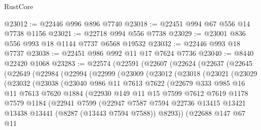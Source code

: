 \begin{lexlean}{RustCore}
\begin{coremodule}
@23012 := @22446 @996 @896 @7740
@23018 := @22451 @994 @67 @556 @14 @7738 @1156
@23021 := @22718 @994 @556 @7738
@23029 := @23001 @836 @556 @993 @18 @1144 @7737 @6568 @19532
@23032 := @22446 @993 @18 @7737
@23038 := @22451 @986 @992 @11 @17 @7624 @7736
@23040 := @8440 @22420 @1068
@23283 := @22574
    (@22591
      (@22607
        (@22624
          (@22637
            (@22645
              (@22649
                (@22984
                  (@22994
                    (@22999
                      (@23009
                        (@23012
                          (@23018
                            (@23021
                              (@23029
                                (@23032
                                  (@23038
                                    (@23040
                                      @986
                                      @11
                                      @7613
                                      @7622
                                      (@22679
                                        @333
                                        @985
                                        @16
                                        @11
                                        @7613
                                        @7620
                                        @1884
                                        (@22930
                                          @149
                                          @11
                                          @15
                                          @7599
                                          @7612
                                          @7619
                                          @1178
                                          @7579
                                          @1184
                                          (@22941
                                            @7599
                                            (@22947
                                              @7587
                                              @7594
                                              @22736
                                              @13415
                                              @13421
                                              @13438
                                              @13441
                                              (@8287 (@13443 @7594 @7588))
                                              @8293))
                                          (@22688
                                            @147
                                            @67
                                            @11

\end{coremodule}
\end{lexlean}

